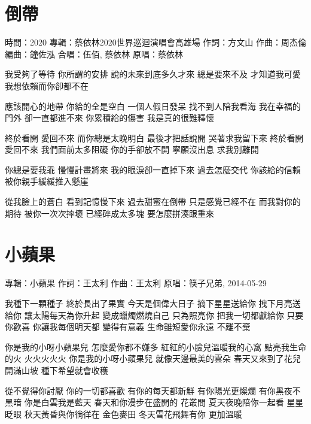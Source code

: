 \documentclass[UTF8,a4paper,oneside,twocolumn,12pt]{ctexbook}
\newcommand{\infopair}[2]{\textbullet #1：#2}
\newcommand{\zc}[1][伍佰]{\infopair{作詞}{#1}}
\newcommand{\zq}[1][伍佰]{\infopair{作曲}{#1}}
\newcommand{\bq}[1][伍佰]{\infopair{編曲}{#1}}
\newcommand{\zj}[1]{\infopair{專輯}{#1}}
\newcommand{\yc}[1]{\infopair{原唱}{#1}}
\newcommand{\sj}[1]{\infopair{時間}{#1}}
\newenvironment{info}{\begin{flushleft}\kaishu
	}
	{\end{flushleft}\normalsize\yahei\par}
\newenvironment{lyric}{
	}
{}
\begin{document}
\section{倒帶}
\begin{info}
	\sj{2020}
	\zj{蔡依林2020世界巡迴演唱會高雄場}
	\zc[方文山]
	\zq[周杰倫]
	\bq[鐘佐泓]
	\infopair{合唱}{伍佰, 蔡依林}
	\yc{蔡依林}
\end{info}
\begin{lyric}
	我受夠了等待 你所謂的安排
	說的未來到底多久才來
	總是要來不及 才知道我可愛
	我想依賴而你卻都不在

	應該開心的地帶 你給的全是空白
	一個人假日發呆 找不到人陪我看海
	我在幸福的門外 卻一直都進不來
	你累積給的傷害 我是真的很難釋懷

	終於看開 愛回不來 而你總是太晚明白
	最後才把話說開 哭著求我留下來
	終於看開 愛回不來 我們面前太多阻礙
	你的手卻放不開 寧願沒出息 求我別離開

	你總是要我乖 慢慢計畫將來
	我的眼淚卻一直掉下來
	過去怎麼交代 你該給的信賴
	被你親手緩緩推入懸崖

	從我臉上的蒼白 看到記憶慢下來
	過去甜蜜在倒帶 只是感覺已經不在
	而我對你的期待 被你一次次摔壞
	已經碎成太多塊 要怎麼拼湊跟重來
\end{lyric}

\section{小蘋果}
\begin{info}
	\zj{小蘋果}
	\zc[王太利]
	\zq[王太利]
	\yc{筷子兄弟, 2014-05-29}
\end{info}
\begin{lyric}
	我種下一顆種子 終於長出了果實
	今天是個偉大日子
	摘下星星送給你 拽下月亮送給你
	讓太陽每天為你升起
	變成蠟燭燃燒自己 只為照亮你
	把我一切都獻給你 只要你歡喜
	你讓我每個明天都 變得有意義
	生命雖短愛你永遠 不離不棄

	你是我的小呀小蘋果兒
	怎麼愛你都不嫌多
	紅紅的小臉兒溫暖我的心窩
	點亮我生命的火 火火火火火
	你是我的小呀小蘋果兒
	就像天邊最美的雲朵
	春天又來到了花兒開滿山坡
	種下希望就會收穫

	從不覺得你討厭 你的一切都喜歡
	有你的每天都新鮮
	有你陽光更燦爛 有你黑夜不黑暗
	你是白雲我是藍天
	春天和你漫步在盛開的 花叢間
	夏天夜晚陪你一起看 星星眨眼
	秋天黃昏與你徜徉在 金色麥田
	冬天雪花飛舞有你 更加溫暖
\end{lyric}
\end{document}
